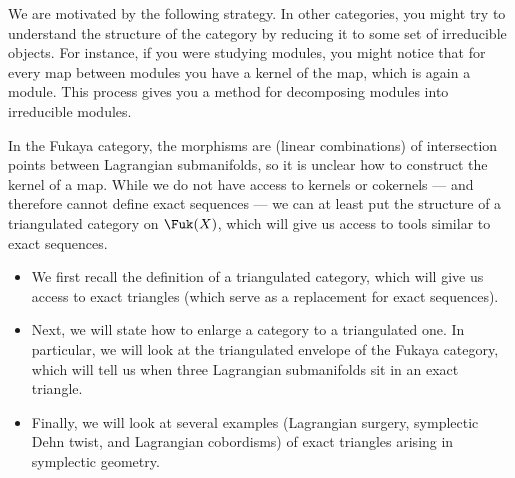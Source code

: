 \begin{exposition}
We are motivated by the following strategy.
In other categories, you might try to understand the structure of the category by reducing it to some set of irreducible objects. For instance, if you were studying modules, you might notice that for every map between modules you have a kernel of the map, which is again a module. This process gives you a method for decomposing modules into irreducible modules. 

In the Fukaya category, the morphisms are (linear combinations) of intersection points between Lagrangian submanifolds, so it is unclear how to construct the kernel of a map.
While we do not have access to kernels or cokernels --- and therefore cannot define exact sequences --- we can at least put the structure of a triangulated category on $\Fuk(X)$, which will give us access to tools similar to exact sequences. 

\begin{itemize}
    \item We first recall the definition of a triangulated category, which will give us access to exact triangles (which serve as a replacement for exact sequences).
    \item Next, we will state how to enlarge a category to a triangulated one. In particular, we will look at the triangulated envelope of the Fukaya category, which will tell us when three Lagrangian submanifolds sit in an exact triangle.
    \item Finally, we will look at several examples (Lagrangian surgery, symplectic Dehn twist, and Lagrangian cobordisms) of exact triangles arising in symplectic geometry.
\end{itemize}









    \end{exposition}